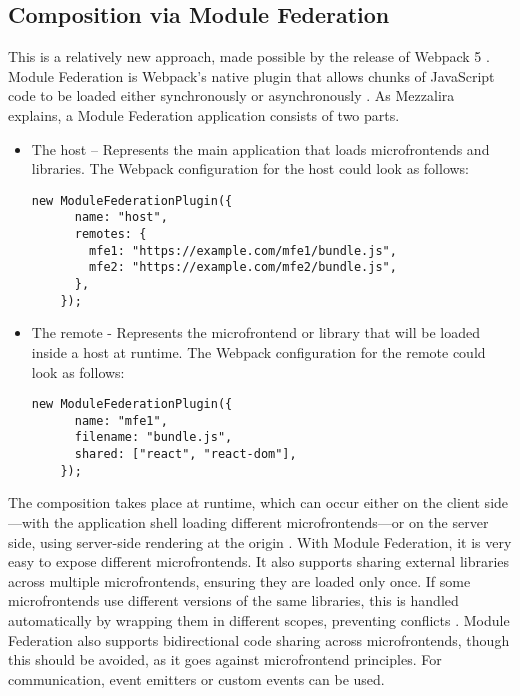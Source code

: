 \subsection{Composition via Module Federation}
This is a relatively new approach, made possible by the release of Webpack 5 \cite{Taibi}. Module Federation is Webpack's native plugin that allows chunks of JavaScript code to be loaded either synchronously or asynchronously \cite{MezzaliraBuildingMf}. As Mezzalira \cite{MezzaliraBuildingMf} explains, a Module Federation application consists of two parts.
\begin{itemize}
  \item The host – Represents the main application that loads microfrontends and libraries. The Webpack configuration for the host could look as follows:
  \begin{lstlisting}[caption={Example of Module Federation host configuration}]
    new ModuleFederationPlugin({
      name: "host",
      remotes: {
        mfe1: "https://example.com/mfe1/bundle.js",
        mfe2: "https://example.com/mfe2/bundle.js",
      },
    });
  \end{lstlisting}
  \item The remote - Represents the microfrontend or library that will be loaded inside a host at runtime. The Webpack configuration for the remote could look as follows:
  \begin{lstlisting}[caption={Example of Module Federation remote configuration}]
    new ModuleFederationPlugin({
      name: "mfe1",
      filename: "bundle.js",
      shared: ["react", "react-dom"],
    });
  \end{lstlisting}
\end{itemize}
The composition takes place at runtime, which can occur either on the client side—with the application shell loading different microfrontends—or on the server side, using server-side rendering at the origin \cite{MezzaliraBuildingMf}. With Module Federation, it is very easy to expose different microfrontends. It also supports sharing external libraries across multiple microfrontends, ensuring they are loaded only once. If some microfrontends use different versions of the same libraries, this is handled automatically by wrapping them in different scopes, preventing conflicts \cite{MezzaliraBuildingMf}. Module Federation also supports bidirectional code sharing across microfrontends, though this should be avoided, as it goes against microfrontend principles. For communication, event emitters or custom events can be used.


